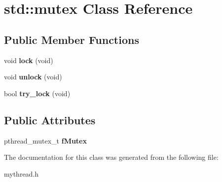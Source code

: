 \hypertarget{classstd_1_1mutex}{\section{std\-:\-:mutex \-Class \-Reference}
\label{classstd_1_1mutex}
}
\subsection*{\-Public \-Member \-Functions}
\begin{DoxyCompactItemize}
\item 
\hypertarget{classstd_1_1mutex_a487c7cb3d4f1eafd7b351dd6dcd82422}{void {\bfseries lock} (void)}\label{classstd_1_1mutex_a487c7cb3d4f1eafd7b351dd6dcd82422}

\item 
\hypertarget{classstd_1_1mutex_a13f22c85c4954c20610ab2e9023d22e8}{void {\bfseries unlock} (void)}\label{classstd_1_1mutex_a13f22c85c4954c20610ab2e9023d22e8}

\item 
\hypertarget{classstd_1_1mutex_a6d836f56c290b512299071b7e69c718c}{bool {\bfseries try\-\_\-lock} (void)}\label{classstd_1_1mutex_a6d836f56c290b512299071b7e69c718c}

\end{DoxyCompactItemize}
\subsection*{\-Public \-Attributes}
\begin{DoxyCompactItemize}
\item 
\hypertarget{classstd_1_1mutex_ad3f0ed1898da93670cc4424d5a6a3149}{pthread\-\_\-mutex\-\_\-t {\bfseries f\-Mutex}}\label{classstd_1_1mutex_ad3f0ed1898da93670cc4424d5a6a3149}

\end{DoxyCompactItemize}


\-The documentation for this class was generated from the following file\-:\begin{DoxyCompactItemize}
\item 
mythread.\-h\end{DoxyCompactItemize}
